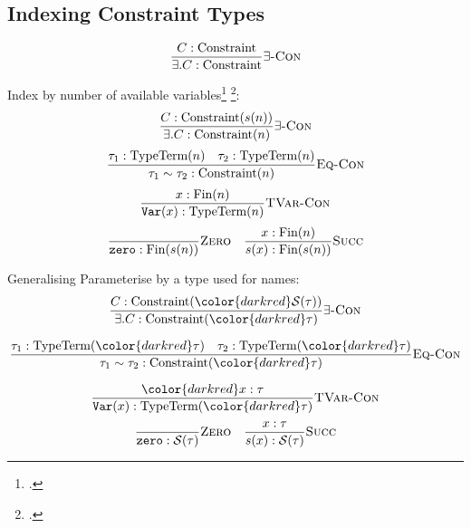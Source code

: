 \documentclass{beamer}
\newcommand{\Inf}[3][!*NEVER USED ARGUMENT*!]{%
  \ifthenelse{\equal{#1}{!*NEVER USED ARGUMENT*!}}{%
    \dfrac{#2}{#3}
  }{%
    \dfrac{#2}{#3}(#1)
  }%
}
\begin{document}
\subsection {Indexing Constraint Types}
\begin{frame}
	\begin{displaymath}
		\Inf{C : \text{Constraint}}{\exists. C : \text{Constraint}}{\exists\textsc{-Con}}
	\end{displaymath}
\end{frame}
\begin{frame}
	Index by number of available variables\footcite{Morris04exploringthe} \footcite{McBride:2003bg}:
	\begin{displaymath}
		\Inf{C : \text{Constraint}(s(n))}{\exists. C : \text{Constraint}(n)}{\exists\textsc{-Con}}
	\end{displaymath}
	\pause
	\begin{displaymath}
		\Inf{\tau_1 : \text{TypeTerm}(n)\quad\tau_2 : \text{TypeTerm}(n)}{\tau_1 \sim \tau_2 : \text{Constraint}(n)}{\textsc{Eq-Con}}
	\end{displaymath}
	\pause
	\begin{displaymath}
		\Inf{x : \text{Fin}(n)}{ \mathtt{Var}(x) : \text{TypeTerm}(n)}{\textsc{TVar-Con}}
	\end{displaymath}
	\pause
		\color{darkblue}
	\begin{displaymath}
		\Inf{}{\mathtt{zero} : \text{Fin}(s(n))}{\textsc{Zero}} \quad \Inf{x : \text{Fin}(n)}{ s(x) : \text{Fin}(s(n)) }{\textsc{Succ}}
	\end{displaymath}
\end{frame}
\begin{frame}{Generalising}
	Parameterise by a type used for names:
	\begin{displaymath}
		\Inf{C : \text{Constraint}({\color{darkred}\mathcal{S}(\tau)})}{\exists. C : \text{Constraint}({\color{darkred} \tau})}{\exists\textsc{-Con}}
	\end{displaymath}

	\begin{displaymath}
		\Inf{\tau_1 : \text{TypeTerm}({\color{darkred}\tau})\quad\tau_2 : \text{TypeTerm}({\color{darkred}\tau})}{\tau_1 \sim \tau_2 : \text{Constraint}({\color{darkred}\tau})}{\textsc{Eq-Con}}
	\end{displaymath}

	\begin{displaymath}
		\Inf{\color{darkred} x : \tau}{ \mathtt{Var}(x) : \text{TypeTerm}({\color{darkred}\tau})}{\textsc{TVar-Con}}
	\end{displaymath}
	\pause
	\color{darkgreen}
	\begin{displaymath}
		\Inf{}{\mathtt{zero} : \mathcal{S}(\tau)}{\textsc{Zero}}\quad\Inf{x : \tau}{s(x) : \mathcal{S}(\tau)}{\textsc{Succ}}
	\end{displaymath}
\end{frame}
\end{document}
